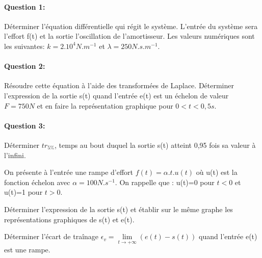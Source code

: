 \paragraph{Question 1:}

Déterminer l'équation différentielle qui régit le système. L'entrée du système sera l'effort f(t) et la sortie l'oscillation de l'amortisseur. Les valeurs numériques sont les suivantes: $k=2.10^4N.m^{-1}$ et $\lambda=250N.s.m^{-1}$.

\paragraph{Question 2:}

Résoudre cette équation à l'aide des transformées de Laplace. Déterminer l'expression de la sortie s(t) quand l'entrée e(t) est un échelon de valeur $F=750N$ et en faire la représentation graphique pour $0<t<0,5s$.

\paragraph{Question 3:}

Déterminer $tr_{5\%}$, temps au bout duquel la sortie s(t) atteint 0,95 fois sa valeur à l'infini.

On présente à l'entrée une rampe d'effort $f(t)=\alpha.t.u(t)$ où u(t) est la fonction échelon avec $\alpha=100N.s^{-1}$. On rappelle que : u(t)=0 pour $t<0$ et u(t)=1 pour $t>0$.

Déterminer l'expression de la sortie s(t) et établir sur le même graphe les représentations graphiques de s(t) et e(t).

Déterminer l'écart de traînage $\epsilon_v=\lim\limits_{t \to +\infty}(e(t)-s(t))$ quand l'entrée e(t) est une rampe.

